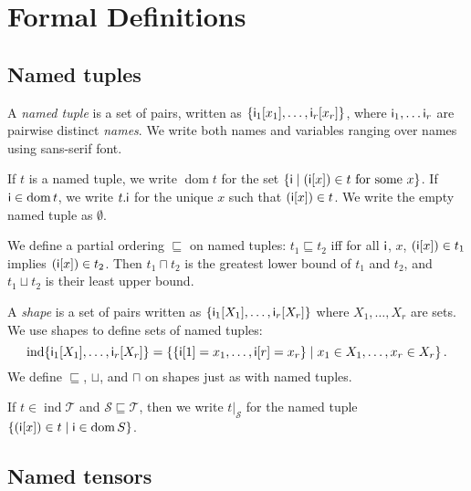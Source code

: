 \documentclass{article}
\newcommand{\tuple}[1]{\{#1\}}
\DeclareMathOperator{\tupledom}{dom}
\DeclareMathOperator{\tupleshape}{ind}
\newcommand{\tupleproj}[2]{#1.\name{#2}}
\newcommand{\tuplerestrict}[2]{\left.#1\right|_{#2}}
\begin{document}
\section{Formal Definitions}
\label{sec:definitions}

\newcommand{\sub}[1]{_\text{$#1$}}

\subsection{Named tuples}

A \emph{named tuple} is a set of pairs, written as $\tuple{\nidx{i\sub{1}}{x_1}, \ldots, \nidx{i\sub{r}}{x_r}}$, where $\name{i\sub{1}}, \ldots \name{i\sub{r}}$ are pairwise distinct \emph{names}. We write both names and variables ranging over names using sans-serif font.

If $t$ is a named tuple, we write $\tupledom{t}$ for the set $\{\mathsf{i} \mid \text{$(\mathsf{i}[x]) \in t$ for some $x$} \}$. If $\name{i} \in \tupledom{t}$, we write $\tupleproj{t}{i}$ for the unique $x$ such that $(\mathsf{i}[x]) \in t$. We write the empty named tuple as $\emptyset$.

We define a partial ordering $\sqsubseteq$ on named tuples: $t_1 \sqsubseteq t_2$ iff for all $\mathsf{i}$, $x$, $(\mathsf{i}[x]) \in t_1$ implies $(\mathsf{i}[x]) \in t_2$. Then $t_1 \sqcap t_2$ is the greatest lower bound of $t_1$ and $t_2$, and $t_1 \sqcup t_2$ is their least upper bound.

A \emph{shape} is a set of pairs written as $\tuple{\nset{i\sub{1}}{X_1}, \ldots, \nset{i\sub{r}}{X_r}}$ where $X_1, \ldots, X_r$ are sets. We use shapes to define sets of named tuples:
\begin{equation*}
\tupleshape \tuple{\nset{i\sub{1}}{X_1}, \ldots, \nset{i\sub{r}}{X_r}} = \left\{\tuple{\nidx{i}{1}=x_1, \ldots, \nidx{i}{r}=x_r} \mid x_1 \in X_1, \ldots, x_r \in X_r\right\}.
\end{equation*}
We define $\sqsubseteq$, $\sqcup$, and $\sqcap$ on shapes just as with named tuples.

If $t \in \tupleshape \mathcal{T}$ and $\mathcal{S} \sqsubseteq \mathcal{T}$, then we write $\tuplerestrict{t}{\mathcal{S}}$ for the named tuple $\{(\nidx{i}{x}) \in t \mid \name{i} \in \tupledom{S}\}$.

\subsection{Named tensors}
\end{document}

